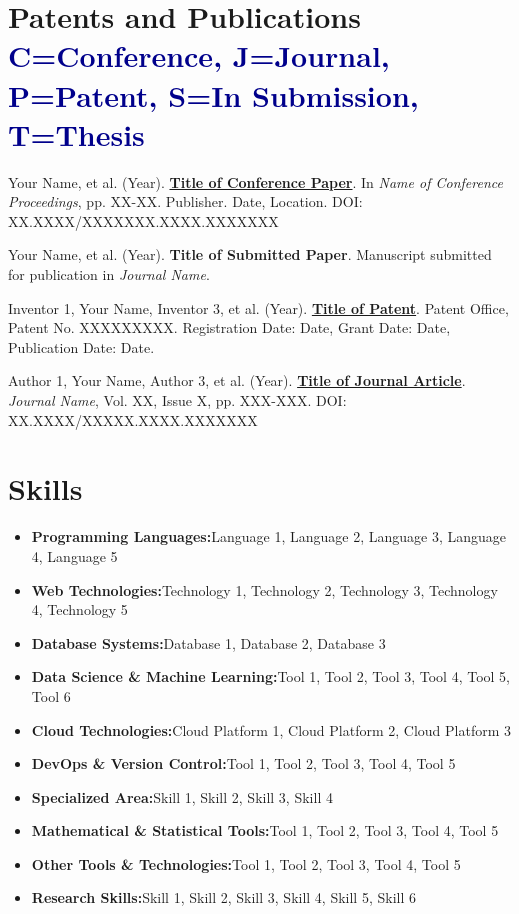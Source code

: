 \documentclass[a4paper,11pt]{article}
\newcommand{\resumeItem}[2]{
	\item{
		\textbf{#1}{\hspace{0.5mm}#2 \vspace{-0.5mm}}
	}
}
\newcommand{\resumeSubItem}[2]{\resumeItem{#1}{#2}\vspace{-4pt}}
\newcommand{\resumeHeadingSkillStart}{\begin{itemize}[leftmargin=*,itemsep=1.7mm, rightmargin=2ex]}
\newcommand{\resumeHeadingSkillEnd}{\end{itemize}\vspace{-2mm}}
\begin{document}
	\section{\textbf{Patents and Publications} \hfill \textcolor{darkblue}{\scriptsize C=Conference, J=Journal, P=Patent, S=In Submission, T=Thesis}}
	\vspace{0.2mm}
	\small{
		\begin{enumerate}[leftmargin=*, labelsep=0.5em, align=left, widest={[\textbf{S.1}]}, itemindent=0em, label={\textbf{[\arabic*]}]}]
			\item[\textbf{[C.1]}] Your Name, et al. (Year). \href{https://doi.org/XX.XXXX/XXXXXXX.XXXX.XXXXXXX}{\textbf{Title of Conference Paper}}. In \textit{Name of Conference Proceedings}, pp. XX-XX. Publisher. Date, Location. DOI: XX.XXXX/XXXXXXX.XXXX.XXXXXXX
			
			\item[\textbf{[S.1]}] Your Name, et al. (Year). \textbf{Title of Submitted Paper}. Manuscript submitted for publication in \textit{Journal Name}.
			
			\item[\textbf{[P.1]}] Inventor 1, Your Name, Inventor 3, et al. (Year). \href{https://patentoffice.gov/patent/XXXXXXXXX}{\textbf{Title of Patent}}. Patent Office, Patent No. XXXXXXXXX. Registration Date: Date, Grant Date: Date, Publication Date: Date.
			
			\item[\textbf{[J.1]}] Author 1, Your Name, Author 3, et al. (Year). \href{https://doi.org/XX.XXXX/XXXXX.XXXX.XXXXXXX}{\textbf{Title of Journal Article}}. \textit{Journal Name}, Vol. XX, Issue X, pp. XXX-XXX. DOI: XX.XXXX/XXXXX.XXXX.XXXXXXX
		\end{enumerate}
	}
	
	\section{\textbf{Skills}}
	\vspace{-0.4mm}
	\resumeHeadingSkillStart
	\resumeSubItem{Programming Languages:}
	{Language 1, Language 2, Language 3, Language 4, Language 5}
	\resumeSubItem{Web Technologies:}
	{Technology 1, Technology 2, Technology 3, Technology 4, Technology 5}
	\resumeSubItem{Database Systems:}
	{Database 1, Database 2, Database 3}
	\resumeSubItem{Data Science \& Machine Learning:}
	{Tool 1, Tool 2, Tool 3, Tool 4, Tool 5, Tool 6}
	\resumeSubItem{Cloud Technologies:}
	{Cloud Platform 1, Cloud Platform 2, Cloud Platform 3}
	\resumeSubItem{DevOps \& Version Control:}
	{Tool 1, Tool 2, Tool 3, Tool 4, Tool 5}
	\resumeSubItem{Specialized Area:}
	{Skill 1, Skill 2, Skill 3, Skill 4}
	\resumeSubItem{Mathematical \& Statistical Tools:}
	{Tool 1, Tool 2, Tool 3, Tool 4, Tool 5}
	\resumeSubItem{Other Tools \& Technologies:}
	{Tool 1, Tool 2, Tool 3, Tool 4, Tool 5}
	\resumeSubItem{Research Skills:}{Skill 1, Skill 2, Skill 3, Skill 4, Skill 5, Skill 6}
	\resumeHeadingSkillEnd
	
\end{document}
